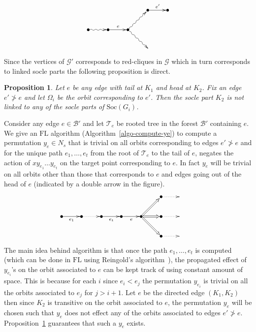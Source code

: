 \documentclass[11pt]{madras}%
\newtheorem{proposition}[theorem]{Proposition}
\theoremstyle{remark}
\newcommand{\Soc}[1]{{\ensuremath{\mathrm{Soc}\left(#1\right)}}}
\begin{document}
\[
\xymatrix@M=0pt@W=0pt{
  &  & & \bullet \ar[r]^{e'} & \bullet \\
  \bullet \ar@{~>}[r] & \bullet \ar[r]^e &  \bullet \ar@{~>}[ur] \ar@{~>}[dr]\\
  &&&& }
\]


Since the vertices of $\mathcal{G}'$ corresponds to red-cliques in
$\mathcal{G}$ which in turn corresponds to linked socle parts the
following proposition is direct.

\begin{proposition}\label{prop-K2-unlinked}
  Let $e$ be any edge with tail at $K_1$ and head at $K_2$. Fix an
  edge $e' \ngtr e$ and let $\Omega_i$ be the orbit corresponding to
  $e'$. Then the socle part $K_2$ is not linked to any of the socle
  parts of $\Soc{G_i}$.
\end{proposition}


Consider any edge $e \in \mathcal{B}'$ and let $\mathcal{T}_e$ be
rooted tree in the forest $\mathcal{B}'$ containing $e$.  We give an
$\mathrm{FL}$ algorithm (Algorithm~\ref{algo-compute-ye}) to compute a
permutation $y_e \in N_s$ that is trivial on all orbits corresponding
to edges $e' \ngtr e$ and for the unique path $e_1,\ldots,e_t$ from
the root of $\mathcal{T}_e$ to the tail of $e$, negates the action of
$xy_{e_1}\ldots y_{e_t}$ on the target point corresponding to $e$. In
fact $y_e$ will be trivial on all orbits other than those that
corresponds to $e$ and edges going out of the head of $e$ (indicated
by a double arrow in the figure).

\[
\xymatrix@M=0pt@W=0pt{
  & & & & &  \bullet \ar@{.>}[r] & \\
  \bullet \ar[r]_{e_1} & %
  \bullet \ar@{.>}[r] & %
  \bullet \ar[r]_{e_t} & %
  \bullet \ar[r]_e & %
  \bullet \ar@{=>}[ur] \ar@{=>}[r] \ar@{=>}[dr] %
  &\bullet \ar@{.>}[r] & &
  \\
  & & & & &  \bullet \ar@{.>}[r] & \\
}
\]

The main idea behind algorithm is that once the path $e_1,\ldots,e_t$
is computed (which can be done in $\mathrm{FL}$ using Reingold's
algorithm~\cite{reingold2005undirected}), the propagated effect of
$y_{e_i}$'s on the orbit associated to $e$ can be kept track of using
constant amount of space. This is because for each $i$ since $e_i <
e_j$ the permutation $y_{e_i}$ is trivial on all the orbits associated
to $e_j$ for $j > i+1$. Let $e$ be the directed edge $(K_1,K_2)$ then
since $K_2$ is transitive on the orbit associated to $e$, the
permutation $y_e$ will be chosen such that $y_e$ does not effect any
of the orbits associated to edges $e' \ngtr e$.
Proposition~\ref{prop-K2-unlinked} guarantees that such a $y_e$ exists.
\end{document}
